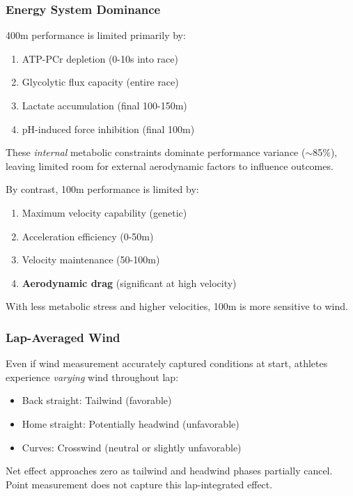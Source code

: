 \subsubsection{Energy System Dominance}

400m performance is limited primarily by:
\begin{enumerate}
    \item ATP-PCr depletion (0-10s into race)
    \item Glycolytic flux capacity (entire race)
    \item Lactate accumulation (final 100-150m)
    \item pH-induced force inhibition (final 100m)
\end{enumerate}

These \textit{internal} metabolic constraints dominate performance variance ($\sim$85\%), leaving limited room for external aerodynamic factors to influence outcomes.

By contrast, 100m performance is limited by:
\begin{enumerate}
    \item Maximum velocity capability (genetic)
    \item Acceleration efficiency (0-50m)
    \item Velocity maintenance (50-100m)
    \item \textbf{Aerodynamic drag} (significant at high velocity)
\end{enumerate}

With less metabolic stress and higher velocities, 100m is more sensitive to wind.

\subsubsection{Lap-Averaged Wind}

Even if wind measurement accurately captured conditions at start, athletes experience \textit{varying} wind throughout lap:
\begin{itemize}
    \item Back straight: Tailwind (favorable)
    \item Home straight: Potentially headwind (unfavorable)
    \item Curves: Crosswind (neutral or slightly unfavorable)
\end{itemize}

Net effect approaches zero as tailwind and headwind phases partially cancel. Point measurement does not capture this lap-integrated effect.

